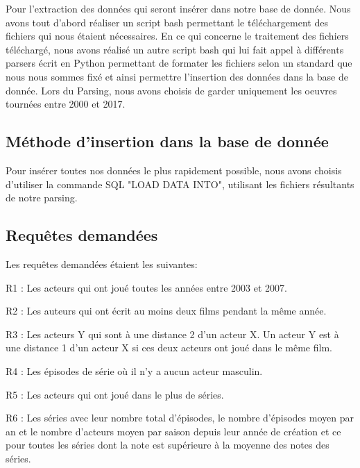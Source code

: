 \documentclass[10pt,a4paper]{article}
\begin{document}
Pour l'extraction des données qui seront insérer dans notre base de donnée. Nous avons tout d'abord réaliser un script bash permettant le téléchargement des fichiers qui nous étaient nécessaires. En ce qui concerne le traitement des fichiers téléchargé, nous avons réalisé un autre script bash qui lui fait appel à différents parsers écrit en Python permettant de formater les fichiers selon un standard que nous nous sommes fixé et ainsi permettre l'insertion des données dans la base de donnée. Lors du Parsing, nous avons choisis de garder uniquement les oeuvres tournées entre 2000 et 2017.

\subsection{Méthode d'insertion dans la base de donnée}

Pour insérer toutes nos données le plus rapidement possible, nous avons choisis d'utiliser la commande SQL "LOAD DATA INTO", utilisant les fichiers résultants de notre parsing.


\subsection{Requêtes demandées}
Les requêtes demandées étaient les suivantes:
\begin{list}{-}{}
  \item R1 : Les acteurs qui ont joué toutes les années entre 2003 et
    2007.
  \item R2 : Les auteurs qui ont écrit au moins deux films pendant la
    même année.
  \item R3 : Les acteurs Y qui sont à une distance 2 d'un acteur X. Un
    acteur Y est à une distance 1 d'un acteur X si ces deux acteurs
    ont joué dans le même film.
  \item R4 : Les épisodes de série où il n'y a aucun acteur masculin.
  \item R5 : Les acteurs qui ont joué dans le plus de séries.
  \item R6 : Les séries avec leur nombre total d'épisodes, le nombre
    d'épisodes moyen par an et le nombre d'acteurs moyen par saison
    depuis leur année de création et ce pour toutes les séries dont la
    note est supérieure à la moyenne des notes des séries.
\end{list}
\end{document}
